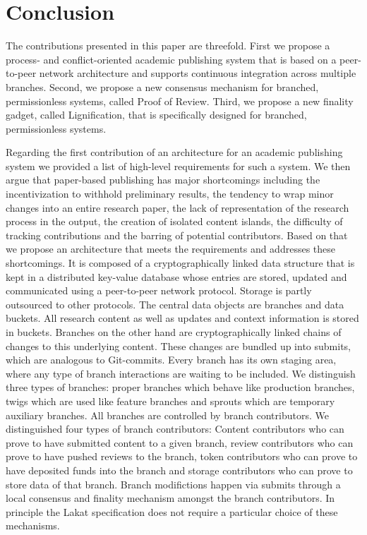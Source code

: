 \section{Conclusion}
\label{sc:conclusion}

The contributions presented in this paper are threefold. First we propose a process- and conflict-oriented academic publishing system that is based on a peer-to-peer network architecture and supports continuous integration across multiple branches. Second, we propose a new consensus mechanism for branched, permissionless systems, called Proof of Review. Third, we propose a new finality gadget, called Lignification, that is specifically designed for branched, permissionless systems. 

Regarding the first contribution of an architecture for an academic publishing system we provided a list of high-level requirements for such a system. We then argue that paper-based publishing has major shortcomings including the incentivization to withhold preliminary results, the tendency to wrap minor changes into an entire research paper, the lack of representation of the research process in the output, the creation of isolated content islands, the difficulty of tracking contributions and the barring of potential contributors. Based on that we propose an architecture that meets the requirements and addresses these shortcomings. It is composed of a cryptographically linked data structure that is kept in a distributed key-value database whose entries are stored, updated and communicated using a peer-to-peer network protocol. Storage is partly outsourced to other protocols. The central data objects are branches and data buckets. All research content as well as updates and context information is stored in buckets. Branches on the other hand are cryptographically linked chains of changes to this underlying content. These changes are bundled up into submits, which are analogous to Git-commits. Every branch has its own staging area, where any type of branch interactions are waiting to be included. We distinguish three types of branches: proper branches which behave like production branches, twigs which are used like feature branches and sprouts which are temporary auxiliary branches. All branches are controlled by branch contributors. We distinguished four types of branch contributors: Content contributors who can prove to have submitted content to a given branch, review contributors who can prove to have pushed reviews to the branch, token contributors who can prove to have deposited funds into the branch and storage contributors who can prove to store data of that branch. Branch modifictions happen via submits through a local consensus and finality mechanism amongst the branch contributors. In principle the Lakat specification does not require a particular choice of these mechanisms.

